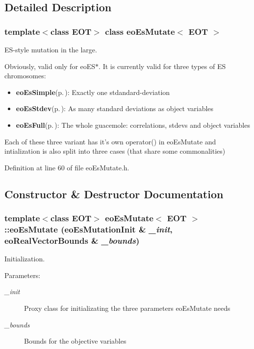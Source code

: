\subsection{Detailed Description}
\subsubsection*{template$<$class EOT$>$ class eo\-Es\-Mutate$<$ EOT $>$}

ES-style mutation in the large. 

Obviously, valid only for eo\-ES$\ast$. It is currently valid for three types of ES chromosomes:\begin{itemize}
\item {\bf eo\-Es\-Simple}{\rm (p.\,\pageref{classeo_es_simple})}: Exactly one stdandard-deviation\item {\bf eo\-Es\-Stdev}{\rm (p.\,\pageref{classeo_es_stdev})}: As many standard deviations as object variables\item {\bf eo\-Es\-Full}{\rm (p.\,\pageref{classeo_es_full})}: The whole guacemole: correlations, stdevs and object variables\end{itemize}


Each of these three variant has it's own operator() in eo\-Es\-Mutate and intialization is also split into three cases (that share some commonalities) 



Definition at line 60 of file eo\-Es\-Mutate.h.

\subsection{Constructor \& Destructor Documentation}
\subsubsection{\setlength{\rightskip}{0pt plus 5cm}template$<$class EOT$>$ {\bf eo\-Es\-Mutate}$<$ {\bf EOT} $>$::{\bf eo\-Es\-Mutate} ({\bf eo\-Es\-Mutation\-Init} \& {\em \_\-init}, {\bf eo\-Real\-Vector\-Bounds} \& {\em \_\-bounds})\hspace{0.3cm}{\tt  [inline]}}\label{classeo_es_mutate_a0}


Initialization. 

\begin{Desc}
\item[Parameters:]
\begin{description}
\item[{\em \_\-init}]Proxy class for initializating the three parameters eo\-Es\-Mutate needs \item[{\em \_\-bounds}]Bounds for the objective variables \end{description}
\end{Desc}


